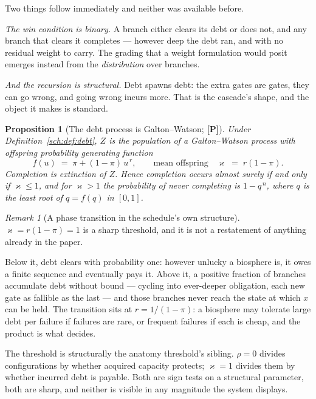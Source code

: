 \documentclass[11pt]{article}
\numberwithin{equation}{section}
\theoremstyle{plain}
\newtheorem{proposition}[theorem]{Proposition}
\theoremstyle{definition}
\theoremstyle{remark}
\newtheorem{remark}[theorem]{Remark}
\begin{document}
Two things follow immediately and neither was available before.

\emph{The win condition is binary.} A branch either clears its debt or
does not, and any branch that clears it completes --- however deep the
debt ran, and with no residual weight to carry. The grading that a
weight formulation would posit emerges instead from the
\emph{distribution} over branches.

\emph{And the recursion is structural.} Debt spawns debt: the extra
gates are gates, they can go wrong, and going wrong incurs more. That is
the cascade's shape, and the object it makes is standard.

\begin{proposition}[The debt process is Galton--Watson; \textbf{[P]}]
\label{sch:prop:gw}
Under Definition~\ref{sch:def:debt}, $Z$ is the population of a
Galton--Watson process with offspring probability generating function
\begin{equation}\label{sch:eq:pgf}
f(u)\;=\;\pi+(1-\pi)\,u^{\,r},
\qquad\text{mean offspring}\quad \varkappa\;=\;r(1-\pi).
\end{equation}
Completion is extinction of $Z$. Hence completion occurs almost surely
if and only if $\varkappa\le1$, and for $\varkappa>1$ the probability of never
completing is $1-q^{\,n}$, where $q$ is the least root of $q=f(q)$ in
$[0,1]$.
\end{proposition}

\begin{remark}[A phase transition in the schedule's own structure]
\label{sch:rem:criticality}
$\varkappa=r(1-\pi)=1$ is a sharp threshold, and it is not a restatement of
anything already in the paper.

Below it, debt clears with probability one: however unlucky a biosphere
is, it owes a finite sequence and eventually pays it. Above it, a
positive fraction of branches accumulate debt without bound --- cycling
into ever-deeper obligation, each new gate as fallible as the last ---
and those branches never reach the state at which $x$ can be held. The
transition sits at $r=1/(1-\pi)$: a biosphere may tolerate large debt
per failure if failures are rare, or frequent failures if each is cheap,
and the product is what decides.

The threshold is structurally the anatomy threshold's sibling. $\rho=0$
divides configurations by whether acquired capacity protects; $\varkappa=1$
divides them by whether incurred debt is payable. Both are sign tests on
a structural parameter, both are sharp, and neither is visible in any
magnitude the system displays.
\end{remark}
\end{document}

